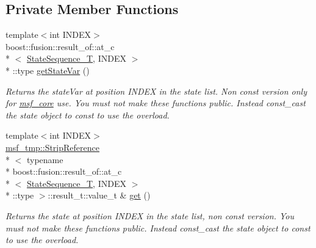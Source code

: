 \subsection*{Private Member Functions}
\begin{DoxyCompactItemize}
\item 
{\footnotesize template$<$int I\-N\-D\-E\-X$>$ }\\boost\-::fusion\-::result\-\_\-of\-::at\-\_\-c\\*
$<$ \hyperlink{structmsf__core_1_1GenericState__T_a75fe70f7c7517dbf7d4c91b75b08a1dd}{State\-Sequence\-\_\-\-T}, I\-N\-D\-E\-X $>$\\*
\-::type \hyperlink{structmsf__core_1_1GenericState__T_af2a7f21605baa4d087c0198c480411b0}{get\-State\-Var} ()
\begin{DoxyCompactList}\small\item\em Returns the state\-Var at position I\-N\-D\-E\-X in the state list. Non const version only for \hyperlink{namespacemsf__core}{msf\-\_\-core} use. You must not make these functions public. Instead const\-\_\-cast the state object to const to use the overload. \end{DoxyCompactList}\item 
{\footnotesize template$<$int I\-N\-D\-E\-X$>$ }\\\hyperlink{structmsf__tmp_1_1StripReference}{msf\-\_\-tmp\-::\-Strip\-Reference}\\*
$<$ typename \\*
boost\-::fusion\-::result\-\_\-of\-::at\-\_\-c\\*
$<$ \hyperlink{structmsf__core_1_1GenericState__T_a75fe70f7c7517dbf7d4c91b75b08a1dd}{State\-Sequence\-\_\-\-T}, I\-N\-D\-E\-X $>$\\*
\-::type $>$\-::result\-\_\-t\-::value\-\_\-t \& \hyperlink{structmsf__core_1_1GenericState__T_a6661c40481117ae5cb40862e1dcb76df}{get} ()
\begin{DoxyCompactList}\small\item\em Returns the state at position I\-N\-D\-E\-X in the state list, non const version. You must not make these functions public. Instead const\-\_\-cast the state object to const to use the overload. \end{DoxyCompactList}\end{DoxyCompactItemize}
